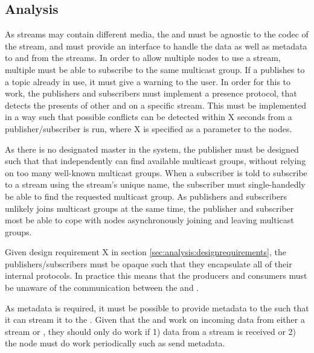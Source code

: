 \subsection{Analysis} \label{sec:analysis:pubsup:introduction}
As streams may contain different media, the  and  must be agnostic to the codec of the stream, and must provide an interface to handle the data as well as metadata to and from the streams.
In order to allow multiple nodes to use a stream, multiple  must be able to subscribe to the same multicast group. If a  publishes to a topic already in use, it must give a warning to the user. In order for this to work, the publishers and subscribers must implement a presence protocol, that detects the presents of other  and  on a specific stream. This must be implemented in a way such that possible conflicts can be detected within X seconds from a publisher/subscriber is run, where X is specified as a parameter to the nodes.

As there is no designated master in the system, the publisher must be designed such that that independently can find available multicast groups, without relying on too many well-known multicast groups. When a subscriber is told to subscribe to a stream using the stream's unique name, the subscriber must single-handedly be able to find the requested multicast group.
As publishers and subscribers unlikely joins multicast groups at the same time, the publisher and subscriber most be able to cope with nodes asynchronously joining and leaving multicast groups.

Given design requirement X in section \ref{sec:analysis:designrequirements}, the publishers/subscribers must be opaque such that they encapsulate all of their internal protocols. In practice this means that the producers and consumers must be unaware of the communication between the  and .



As metadata is required, it must be possible to provide metadata to the  such that it can stream it to the .
Given that the  and  work on incoming data from either a stream or , they should only do work if 1) data from a stream is received or 2) the node must do work periodically such as send metadata.

